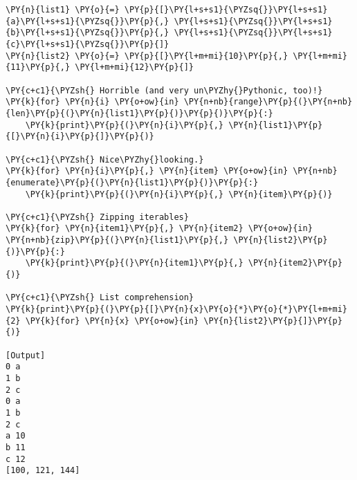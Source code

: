 \begin{Verbatim}[label=\makebox{\url{https://bitbucket.org/lbaldini/programming/src/tip/snippets/iteration.py}},commandchars=\\\{\}]
\PY{n}{list1} \PY{o}{=} \PY{p}{[}\PY{l+s+s1}{\PYZsq{}}\PY{l+s+s1}{a}\PY{l+s+s1}{\PYZsq{}}\PY{p}{,} \PY{l+s+s1}{\PYZsq{}}\PY{l+s+s1}{b}\PY{l+s+s1}{\PYZsq{}}\PY{p}{,} \PY{l+s+s1}{\PYZsq{}}\PY{l+s+s1}{c}\PY{l+s+s1}{\PYZsq{}}\PY{p}{]}
\PY{n}{list2} \PY{o}{=} \PY{p}{[}\PY{l+m+mi}{10}\PY{p}{,} \PY{l+m+mi}{11}\PY{p}{,} \PY{l+m+mi}{12}\PY{p}{]}

\PY{c+c1}{\PYZsh{} Horrible (and very un\PYZhy{}Pythonic, too)!}
\PY{k}{for} \PY{n}{i} \PY{o+ow}{in} \PY{n+nb}{range}\PY{p}{(}\PY{n+nb}{len}\PY{p}{(}\PY{n}{list1}\PY{p}{)}\PY{p}{)}\PY{p}{:}
    \PY{k}{print}\PY{p}{(}\PY{n}{i}\PY{p}{,} \PY{n}{list1}\PY{p}{[}\PY{n}{i}\PY{p}{]}\PY{p}{)}

\PY{c+c1}{\PYZsh{} Nice\PYZhy{}looking.}
\PY{k}{for} \PY{n}{i}\PY{p}{,} \PY{n}{item} \PY{o+ow}{in} \PY{n+nb}{enumerate}\PY{p}{(}\PY{n}{list1}\PY{p}{)}\PY{p}{:}
    \PY{k}{print}\PY{p}{(}\PY{n}{i}\PY{p}{,} \PY{n}{item}\PY{p}{)}

\PY{c+c1}{\PYZsh{} Zipping iterables}
\PY{k}{for} \PY{n}{item1}\PY{p}{,} \PY{n}{item2} \PY{o+ow}{in} \PY{n+nb}{zip}\PY{p}{(}\PY{n}{list1}\PY{p}{,} \PY{n}{list2}\PY{p}{)}\PY{p}{:}
    \PY{k}{print}\PY{p}{(}\PY{n}{item1}\PY{p}{,} \PY{n}{item2}\PY{p}{)}

\PY{c+c1}{\PYZsh{} List comprehension}
\PY{k}{print}\PY{p}{(}\PY{p}{[}\PY{n}{x}\PY{o}{*}\PY{o}{*}\PY{l+m+mi}{2} \PY{k}{for} \PY{n}{x} \PY{o+ow}{in} \PY{n}{list2}\PY{p}{]}\PY{p}{)}

[Output]
0 a
1 b
2 c
0 a
1 b
2 c
a 10
b 11
c 12
[100, 121, 144]
\end{Verbatim}